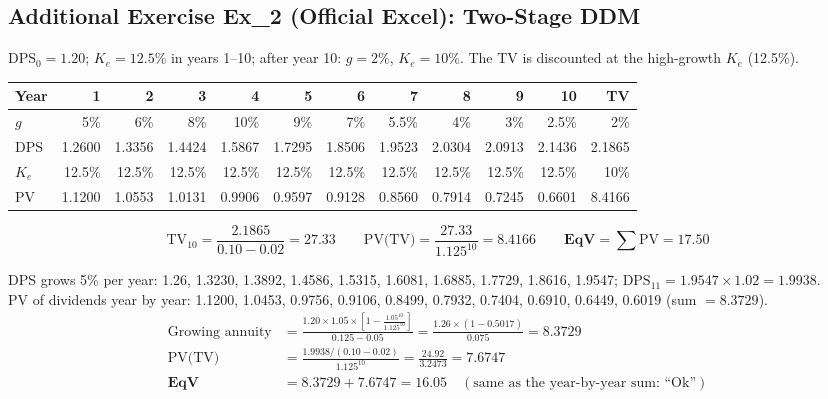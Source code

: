 \subsection{Additional Exercise Ex\_2 (Official Excel): Two-Stage DDM}
\begin{exbox}
$\text{DPS}_0=1.20$; $K_e=12.5\%$ in years 1--10; after year 10: $g=2\%$, $K_e=10\%$. The TV is discounted at the high-growth $K_e$ (12.5\%).
\begin{center}
\scriptsize
\setlength{\tabcolsep}{3pt}
\begin{tabular}{@{}lrrrrrrrrrrr@{}}
\toprule
Year & 1 & 2 & 3 & 4 & 5 & 6 & 7 & 8 & 9 & 10 & TV\\
\midrule
$g$ & 5\% & 6\% & 8\% & 10\% & 9\% & 7\% & 5.5\% & 4\% & 3\% & 2.5\% & 2\%\\
DPS & 1.2600 & 1.3356 & 1.4424 & 1.5867 & 1.7295 & 1.8506 & 1.9523 & 2.0304 & 2.0913 & 2.1436 & 2.1865\\
$K_e$ & 12.5\% & 12.5\% & 12.5\% & 12.5\% & 12.5\% & 12.5\% & 12.5\% & 12.5\% & 12.5\% & 12.5\% & 10\%\\
PV & 1.1200 & 1.0553 & 1.0131 & 0.9906 & 0.9597 & 0.9128 & 0.8560 & 0.7914 & 0.7245 & 0.6601 & 8.4166\\
\bottomrule
\end{tabular}
\end{center}
\[
\text{TV}_{10}=\frac{2.1865}{0.10-0.02}=27.33\qquad \text{PV(TV)}=\frac{27.33}{1.125^{10}}=8.4166\qquad \textbf{EqV}=\sum\text{PV}=\mathbf{17.50}
\]
\end{exbox}
\begin{exbox}
DPS grows 5\% per year: 1.26, 1.3230, 1.3892, 1.4586, 1.5315, 1.6081, 1.6885, 1.7729, 1.8616, 1.9547; $\text{DPS}_{11}=1.9547\times1.02=1.9938$.\\
PV of dividends year by year: 1.1200, 1.0453, 0.9756, 0.9106, 0.8499, 0.7932, 0.7404, 0.6910, 0.6449, 0.6019 (sum $=8.3729$).
\begin{align*}
\text{Growing annuity}&=\frac{1.20\times1.05\times\left[1-\frac{1.05^{10}}{1.125^{10}}\right]}{0.125-0.05}=\frac{1.26\times(1-0.5017)}{0.075}=\mathbf{8.3729}\\
\text{PV(TV)}&=\frac{1.9938/(0.10-0.02)}{1.125^{10}}=\frac{24.92}{3.2473}=\mathbf{7.6747}\\
\textbf{EqV}&=8.3729+7.6747=\mathbf{16.05}\quad(\text{same as the year-by-year sum: ``Ok''})
\end{align*}
\end{exbox}

